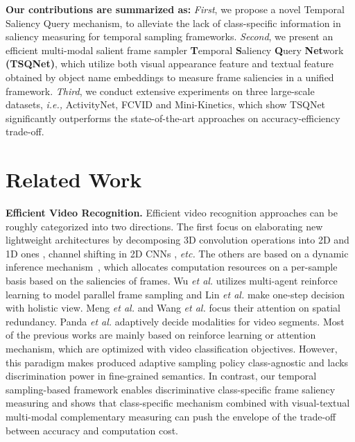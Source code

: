 \documentclass[runningheads]{llncs}
\begin{document}
\textbf{Our contributions are summarized as:}
\textit{First}, we propose a novel Temporal Saliency Query mechanism, to alleviate the lack of class-specific information in saliency measuring for temporal sampling frameworks. 
\textit{Second}, we present an efficient multi-modal salient frame sampler \textbf{T}emporal \textbf{S}aliency \textbf{Q}uery \textbf{Net}work\textbf{ (TSQNet)}, which utilize both visual appearance feature and textual feature obtained by object name embeddings to measure frame saliencies in a unified framework. \textit{Third}, we conduct extensive experiments on three large-scale datasets, \emph{i.e.,} ActivityNet, FCVID and Mini-Kinetics, which show TSQNet significantly outperforms the state-of-the-art approaches on accuracy-efficiency trade-off.













\section{Related Work}
\noindent\textbf{Efficient Video Recognition.} 
Efficient video recognition approaches can be roughly categorized into two directions. The first focus on elaborating new lightweight architectures by decomposing 3D convolution operations into 2D and 1D ones \cite{r2plus1d,s3d,mvf}, channel shifting in 2D CNNs \cite{tsm}, \emph{etc.} 
The others are based on a dynamic inference mechanism~\cite{wu2020dynamic,nsnet,AKnet}, which allocates computation resources on a per-sample basis based on the saliencies of frames. 
Wu \emph{et al.} \cite{marl} utilizes multi-agent reinforce learning to model parallel frame sampling and Lin \emph{et al.} \cite{ocsampler} make one-step decision with holistic view.
Meng \emph{et al.} \cite{arnet} and Wang \emph{et al.}  \cite{adafocus,adafocusv2} focus their attention on spatial redundancy.
Panda \emph{et al.} adaptively decide modalities for video segments. Most of the previous works are mainly based on reinforce learning or attention mechanism, which are optimized with video classification objectives. However, this paradigm makes produced adaptive sampling policy class-agnostic and lacks discrimination power in fine-grained semantics. In contrast, our temporal sampling-based framework enables discriminative class-specific frame saliency measuring and shows that class-specific mechanism combined with visual-textual multi-modal complementary measuring can push the envelope of the trade-off between accuracy and computation cost.  
\end{document}

